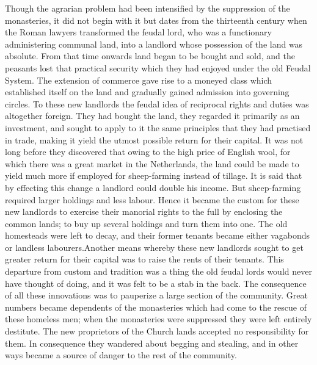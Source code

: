 \documentclass{book}
\begin{document}
Though the agrarian problem had been intensified by the suppression of the monasteries, it did not begin with it but dates from the thirteenth century when the Roman lawyers transformed the feudal lord, who was a functionary administering communal land, into a landlord whose possession of the land was absolute. From that time onwards land began to be bought and sold, and the peasants lost that practical security which they had enjoyed under the old Feudal System. The extension of commerce gave rise to a moneyed class which established itself on the land and gradually gained admission into governing circles. To these new landlords the feudal idea of reciprocal rights and duties was altogether foreign. They had bought the land, they regarded it primarily as an investment, and sought to apply to it the same principles that they had practised in trade, making it yield the utmost possible return for their capital. It was not long before they discovered that owing to the high price of English wool, for which there was a great market in the Netherlands, the land could be made to yield much more if employed for sheep-farming instead of tillage. It is said that by effecting this change a landlord could double his income. But sheep-farming required larger holdings and less labour. Hence it became the custom for these new landlords to exercise their manorial rights to the full by enclosing the common lands; to buy up several holdings and turn them into one. The old homesteads were left to decay, and their former tenants became either vagabonds or landless labourers.\footnotemark[3] Another means whereby these new landlords sought to get greater return for their capital was to raise the rents of their tenants. This departure from custom and tradition was a thing the old feudal lords would never have thought of doing, and it was felt to be a stab in the back. The consequence of all these innovations was to pauperize a large section of the community. Great numbers became dependents of the monasteries which had come to the rescue of these homeless men; when the monasteries were suppressed they were left entirely destitute. The new proprietors of the Church lands accepted no responsibility for them. In consequence they wandered about begging and stealing, and in other ways became a source of danger to the rest of the community.
\end{document}
